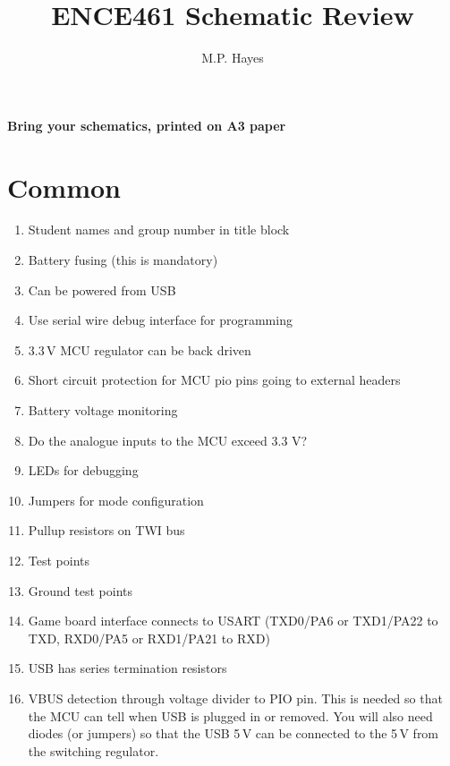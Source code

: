 \documentclass[a4paper, 12pt]{article}
\title{ENCE461 Schematic Review}
\author{M.P. Hayes}
\date{}
\begin{document}
\maketitle


\begin{center}
\textbf{Bring your schematics, printed on A3 paper}  
\end{center}


\section{Common}

\begin{enumerate}
\item Student names and group number in title block

\item Battery fusing (this is mandatory)

\item Can be powered from USB

\item Use serial wire debug interface for programming  

\item 3.3\,V MCU regulator can be back driven

\item Short circuit protection for MCU pio pins going to external headers

\item Battery voltage monitoring

\item Do the analogue inputs to the MCU exceed 3.3 V?  

\item LEDs for debugging  

\item Jumpers for mode configuration

\item Pullup resistors on TWI bus  
  
\item Test points

\item Ground test points

\item Game board interface connects to USART (TXD0/PA6 or TXD1/PA22 to
  TXD, RXD0/PA5 or RXD1/PA21 to RXD)

\item USB has series termination resistors

\item VBUS detection through voltage divider to PIO pin.  This is
  needed so that the MCU can tell when USB is plugged in or removed.
  You will also need diodes (or jumpers) so that the USB 5\,V can be
  connected to the 5\,V from the switching regulator.


\end{enumerate}
\end{document}
